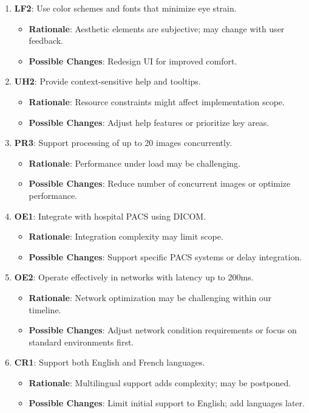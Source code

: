 \documentclass[12pt]{article}
\begin{document}
\begin{enumerate}[resume]
    \item \textbf{LF2}: Use color schemes and fonts that minimize eye strain.
    \begin{itemize}[label=-]
        \item \textbf{Rationale}: Aesthetic elements are subjective; may change with user feedback.
        \item \textbf{Possible Changes}: Redesign UI for improved comfort.
    \end{itemize}

    \item \textbf{UH2}: Provide context-sensitive help and tooltips.
    \begin{itemize}[label=-]
        \item \textbf{Rationale}: Resource constraints might affect implementation scope.
        \item \textbf{Possible Changes}: Adjust help features or prioritize key areas.
    \end{itemize}

    \item \textbf{PR3}: Support processing of up to 20 images concurrently.
    \begin{itemize}[label=-]
        \item \textbf{Rationale}: Performance under load may be challenging.
        \item \textbf{Possible Changes}: Reduce number of concurrent images or optimize performance.
    \end{itemize}

    \item \textbf{OE1}: Integrate with hospital PACS using DICOM.
    \begin{itemize}[label=-]
        \item \textbf{Rationale}: Integration complexity may limit scope.
        \item \textbf{Possible Changes}: Support specific PACS systems or delay integration.
    \end{itemize}

    \item \textbf{OE2}: Operate effectively in networks with latency up to 200ms.
    \begin{itemize}[label=-]
        \item \textbf{Rationale}: Network optimization may be challenging within our timeline.
        \item \textbf{Possible Changes}: Adjust network condition requirements or focus on standard environments first.
    \end{itemize}

    \item \textbf{CR1}: Support both English and French languages.
    \begin{itemize}[label=-]
        \item \textbf{Rationale}: Multilingual support adds complexity; may be postponed.
        \item \textbf{Possible Changes}: Limit initial support to English; add languages later.
    \end{itemize}
\end{enumerate}
\end{document}
